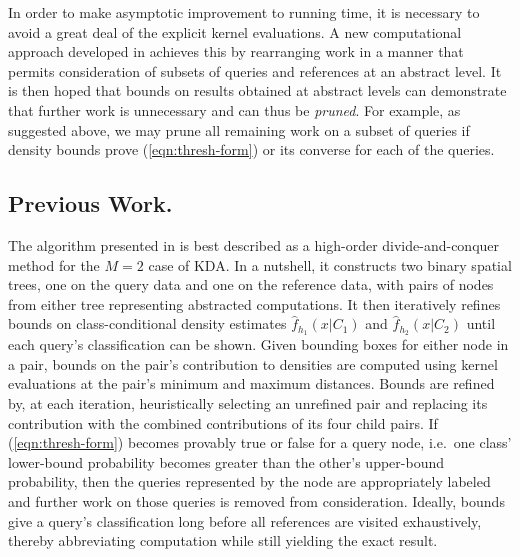 \documentclass[twoside,leqno,twocolumn]{article}
\begin{document}
In order to make asymptotic improvement to running time, it is
necessary to avoid a great deal of the explicit kernel evaluations.  A
new computational approach developed in \cite{nbc-compstat} achieves this by
rearranging work in a manner that permits consideration of subsets of
queries and references at an abstract level.  It is then hoped that
bounds on results obtained at abstract levels can demonstrate that
further work is unnecessary and can thus be {\em pruned}.  For
example, as suggested above, we may prune all remaining work on a
subset of queries if density bounds prove (\ref{eqn:thresh-form}) or
its converse for each of the queries.

\subsection{Previous Work.}
The algorithm presented in \cite{nbc-compstat} is best described as a
high-order divide-and-conquer method for the $M = 2$ case of KDA.  In
a nutshell, it constructs two binary spatial trees, one on the query
data and one on the reference data, with pairs of nodes from either
tree representing abstracted computations.  It then iteratively
refines bounds on class-conditional density estimates
$\widehat{f}_{h_1}(x|C_1)$ and $\widehat{f}_{h_2}(x|C_2)$ until each
query's classification can be shown.  Given bounding boxes for either
node in a pair, bounds on the pair's contribution to densities are
computed using kernel evaluations at the pair's minimum and maximum
distances.  Bounds are refined by, at each iteration, heuristically
selecting an unrefined pair and replacing its contribution with the
combined contributions of its four child pairs.  If
(\ref{eqn:thresh-form}) becomes provably true or false for a query
node, i.e.~one class' lower-bound probability becomes greater than the
other's upper-bound probability, then the queries represented by the
node are appropriately labeled and further work on those queries is
removed from consideration.  Ideally, bounds give a query's
classification long before all references are visited exhaustively,
thereby abbreviating computation while still yielding the exact
result.
\end{document}
